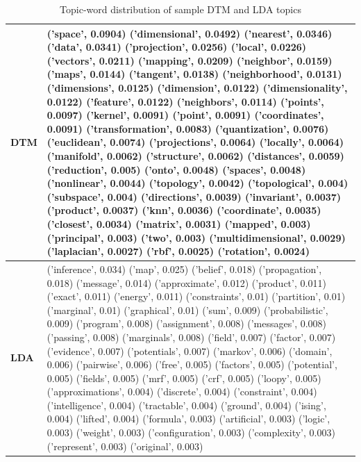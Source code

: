 \begin{table}[h!]
\begin{tabular}{|p{1cm}|p{13cm}|}
\hline \textbf{DTM}  &
('space', 0.0904)	('dimensional', 0.0492)	('nearest', 0.0346)	('data', 0.0341)	('projection', 0.0256)	('local', 0.0226)	('vectors', 0.0211)	('mapping', 0.0209)	('neighbor', 0.0159)	('maps', 0.0144)	('tangent', 0.0138)	('neighborhood', 0.0131)	('dimensions', 0.0125)	('dimension', 0.0122)	('dimensionality', 0.0122)	('feature', 0.0122)	('neighbors', 0.0114)	('points', 0.0097)	('kernel', 0.0091)	('point', 0.0091)	('coordinates', 0.0091)	('transformation', 0.0083)	('quantization', 0.0076)	('euclidean', 0.0074)	('projections', 0.0064)	('locally', 0.0064)	('manifold', 0.0062)	('structure', 0.0062)	('distances', 0.0059)	('reduction', 0.005)	('onto', 0.0048)	('spaces', 0.0048)	('nonlinear', 0.0044)	('topology', 0.0042)	('topological', 0.004)	('subspace', 0.004)	('directions', 0.0039)	('invariant', 0.0037)	('product', 0.0037)	('knn', 0.0036)	('coordinate', 0.0035)	('closest', 0.0034)	('matrix', 0.0031)	('mapped', 0.003)	('principal', 0.003)	('two', 0.003)	('multidimensional', 0.0029)	('laplacian', 0.0027)	('rbf', 0.0025)	('rotation', 0.0024) \\ \hline

\textbf{LDA} &
('inference', 0.034)	('map', 0.025)	('belief', 0.018)	('propagation', 0.018)	('message', 0.014)	('approximate', 0.012)	('product', 0.011)	('exact', 0.011)	('energy', 0.011)	('constraints', 0.01)	('partition', 0.01)	('marginal', 0.01)	('graphical', 0.01)	('sum', 0.009)	('probabilistic', 0.009)	('program', 0.008)	('assignment', 0.008)	('messages', 0.008)	('passing', 0.008)	('marginals', 0.008)	('field', 0.007)	('factor', 0.007)	('evidence', 0.007)	('potentials', 0.007)	('markov', 0.006)	('domain', 0.006)	('pairwise', 0.006)	('free', 0.005)	('factors', 0.005)	('potential', 0.005)	('fields', 0.005)	('mrf', 0.005)	('crf', 0.005)	('loopy', 0.005)	('approximations', 0.004)	('discrete', 0.004)	('constraint', 0.004)	('intelligence', 0.004)	('tractable', 0.004)	('ground', 0.004)	('ising', 0.004)	('lifted', 0.004)	('formula', 0.003)	('artificial', 0.003)	('logic', 0.003)	('weight', 0.003)	('configuration', 0.003)	('complexity', 0.003)	('represent', 0.003)	('original', 0.003) \\ \hline

\end{tabular}
\caption{Topic-word distribution of sample DTM and LDA topics}
\label{table:topicDistribution}
\end{table}

